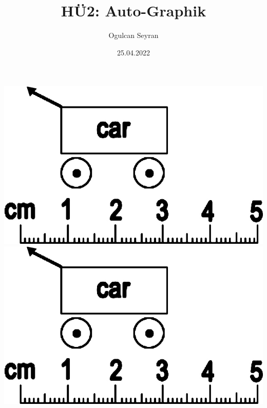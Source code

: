 \documentclass{article}
\title{HÜ2: Auto-Graphik}
\author{Ogulcan Seyran}
\date{25.04.2022}
\begin{document}
	\maketitle
	\begin{center}
		\includegraphics[scale=0.2]{car.jpg} \\
		\includegraphics[scale=0.2, angle = 45]{car.jpg}
	\end{center}
\end{document}
